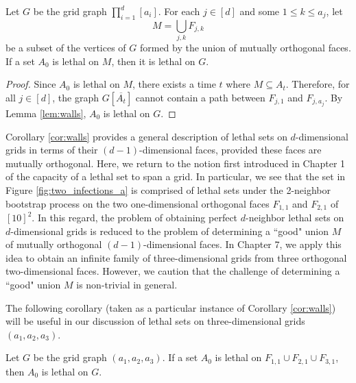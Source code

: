 \begin{cor}
\label{cor:walls}
Let $G$ be the grid graph $\prod_{i=1}^d [a_i]$. For each $j \in [d]$ and some $1 \leq k \leq a_j$, let 
$$M = \bigcup_{j,k} F_{j,k}$$
be a subset of the vertices of $G$ formed by the union of mutually orthogonal faces. If a set $A_0$ is lethal on $M$, then it is lethal on $G$. 
\end{cor}

\begin{proof}
Since $A_0$ is lethal on $M$, there exists a time $t$ where $M \subseteq A_t$. Therefore, for all $j \in [d]$, the graph $G[\overline{A_t}]$ cannot contain a path between $F_{j,1}$ and $F_{j,a_j}$. By Lemma \ref{lem:walls}, $A_0$ is lethal on $G$. 
\end{proof}

Corollary \ref{cor:walls} provides a general description of lethal sets on $d$-dimensional grids in terms of their $(d-1)$-dimensional faces, provided these faces are mutually orthogonal. Here, we return to the notion first introduced in Chapter 1 of the capacity of a lethal set to span a grid. In particular, we see that the set in Figure \ref{fig:two_infections_a} is comprised of lethal sets under the 2-neighbor bootstrap process on the two one-dimensional orthogonal faces $F_{1,1}$ and $F_{2,1}$ of $[10]^2$. In this regard, the problem of obtaining perfect $d$-neighbor lethal sets on $d$-dimensional grids is reduced to the problem of determining a ``good" union $M$ of mutually orthogonal $(d-1)$-dimensional faces. 
In Chapter 7, we apply this idea to obtain an infinite family of three-dimensional grids from three orthogonal two-dimensional faces. However, we caution that the challenge of determining a ``good" union $M$ is non-trivial in general.

The following corollary (taken as a particular instance of Corollary \ref{cor:walls}) will be useful in our discussion of lethal sets on three-dimensional grids $(a_1,a_2,a_3)$. 

\begin{cor}
\label{cor:three_walls}
Let $G$ be the grid graph $(a_1,a_2,a_3)$. If a set $A_0$ is lethal on $F_{1,1} \cup F_{2,1} \cup F_{3,1}$, then $A_0$ is lethal on $G$.
\end{cor}

